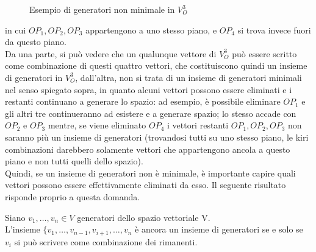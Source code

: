 \clearpage
\begin{figure}[ht!]
  \centering
  \resizebox{5cm}{!}{
    
  }
  \caption{Esempio di generatori non minimale in $V_O^3$}
  \label{fig:generatoriNonMinInVO3}
\end{figure}
in cui $OP_1,OP_2,OP_3$ appartengono a uno stesso piano, e $OP_4$ si trova invece fuori da questo piano.\\
Da una parte, si può vedere che un qualunque vettore di $V_O^3$ può essere scritto come combinazione di questi quattro vettori, che costituiscono quindi un insieme di generatori in $V_O^3$, dall'altra, non si trata di un insieme di generatori minimali nel senso spiegato sopra, in quanto alcuni vettori possono essere eliminati e i restanti continuano a generare lo spazio: ad esempio, è possibile eliminare $OP_1$ e gli altri tre continueranno ad esistere e a generare spazio; lo stesso accade con $OP_2$ e $OP_3$ mentre, se viene eliminato $OP_4$ i vettori restanti $OP_1,OP_2,OP_3$ non saranno più un insieme di generatori (trovandosi tutti su uno stesso piano, le kiri combinazioni darebbero solamente vettori che appartengono ancola a questo piano e non tutti quelli dello spazio).\\
Quindi, se un insieme di generatori non è minimale, è importante capire quali vettori possono essere effettivamente eliminati da esso. Il seguente risultato risponde proprio a questa domanda.
\begin{prop}
  \label{prop:spaziovect1}
  Siano $v_1,\dots,v_n\in V$ generatori dello spazio vettoriale V.\\
  L'insieme $\{v_1,\dots,v_{n-1}, v_{i+1},\dots,v_n$ è ancora un insieme di generatori se e solo se $v_i$ si può scrivere come combinazione dei rimanenti.
\end{prop}
